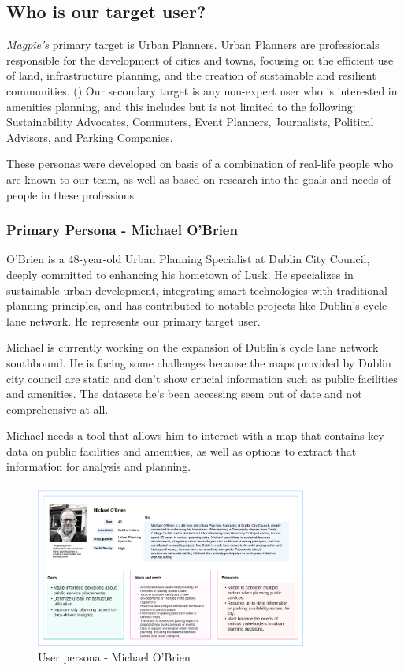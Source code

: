 \subsection{Who is our target user?}
\textit{Magpie's} primary target is Urban Planners. Urban Planners are
professionals responsible for the development of cities and towns, focusing on
the efficient use of land, infrastructure planning, and the creation of
sustainable and resilient communities. (\cite{fischler2012fifty}) Our secondary
target is any non-expert user who is interested in amenities planning, and this
includes but is not limited to the following: Sustainability Advocates,
Commuters, Event Planners, Journalists, Political Advisors, and Parking
Companies.

These personas were developed on basis of a combination of real-life people who
are known to our team, as well as based on research into the goals and needs of
people in these professions

\subsubsection{Primary Persona - Michael O'Brien}
O'Brien is a 48-year-old Urban Planning Specialist at Dublin City Council,
deeply committed to enhancing his hometown of Lusk. He specializes in
sustainable urban development, integrating smart technologies with traditional
planning principles, and has contributed to notable projects like Dublin's cycle
lane network. He represents our primary target user.

Michael is currently working on the expansion of Dublin's cycle lane network
southbound. He is facing some challenges because the maps provided by Dublin
city council are static and don't show crucial information such as public
facilities and amenities. The datasets he's been accessing seem out of date and
not comprehensive at all.

Michael needs a tool that allows him to interact with a map that contains key
data on public facilities and amenities, as well as options to extract that
information for analysis and planning.

\begin{figure}[htbp]
    \centering{}{}
    \includegraphics[width=0.8\textwidth]{images/michael-obrien-userpersona.png}
    \caption{User persona - Michael O'Brien}
\end{figure}

